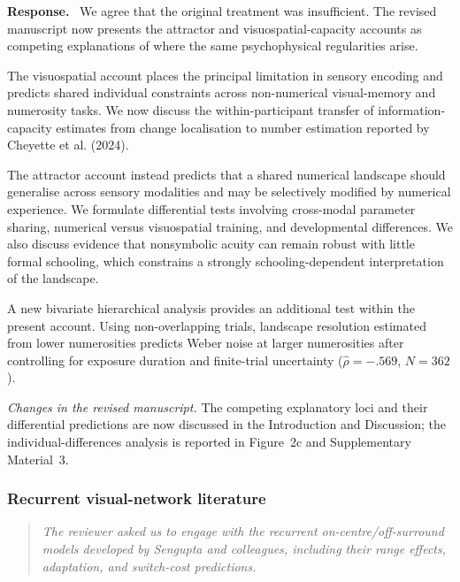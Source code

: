 \documentclass[11pt]{article}
\newenvironment{reviewercomment}{\begin{quote}\color{reviewgray}\itshape}{\end{quote}}
\newenvironment{authorresponse}{\par\noindent\textbf{\color{responseblue}Response.}\ }{\par}
\newcommand{\change}[1]{\par\noindent\textit{Changes in the revised manuscript.} #1\par}
\begin{document}
\begin{authorresponse}
We agree that the original treatment was insufficient. The revised manuscript now presents the attractor and visuospatial-capacity accounts as competing explanations of where the same psychophysical regularities arise.

The visuospatial account places the principal limitation in sensory encoding and predicts shared individual constraints across non-numerical visual-memory and numerosity tasks. We now discuss the within-participant transfer of information-capacity estimates from change localisation to number estimation reported by Cheyette et al. (2024).

The attractor account instead predicts that a shared numerical landscape should generalise across sensory modalities and may be selectively modified by numerical experience. We formulate differential tests involving cross-modal parameter sharing, numerical versus visuospatial training, and developmental differences. We also discuss evidence that nonsymbolic acuity can remain robust with little formal schooling, which constrains a strongly schooling-dependent interpretation of the landscape.

A new bivariate hierarchical analysis provides an additional test within the present account. Using non-overlapping trials, landscape resolution estimated from lower numerosities predicts Weber noise at larger numerosities after controlling for exposure duration and finite-trial uncertainty ($\hat\rho=-.569$, $N=362$).
\end{authorresponse}

\change{The competing explanatory loci and their differential predictions are now discussed in the Introduction and Discussion; the individual-differences analysis is reported in Figure~2c and Supplementary Material~3.}

\subsubsection*{Recurrent visual-network literature}

\begin{reviewercomment}
The reviewer asked us to engage with the recurrent on-centre/off-surround models developed by Sengupta and colleagues, including their range effects, adaptation, and switch-cost predictions.
\end{reviewercomment}
\end{document}
